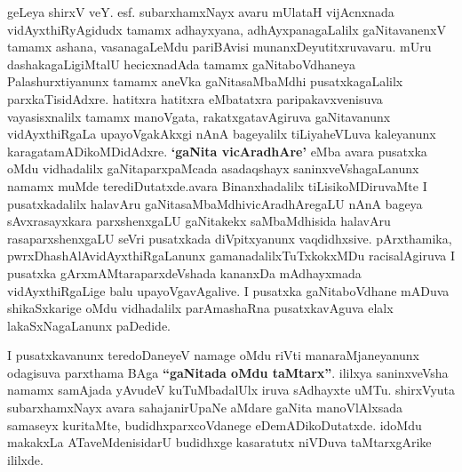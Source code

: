 {\newpage

geLeya shirxV veY. esf. subarxhamxNayx avaru mUlataH vijAcnxnada vidAyxthiRyAgidudx tamamx adhayxyana, adhAyxpanagaLalilx gaNitavanenxV tamamx ashana, vasanagaLeMdu pariBAvisi\- munanxDeyutitxruvavaru. mUru dashakagaLigiMtalU hecicxnadAda tamamx gaNitaboVdha\-neya Palashurxtiyanunx tamamx aneVka gaNitasaMbaMdhi pusatxkagaLalilx parxkaTisidAdxre. hatitxra hatitxra eMbatatxra paripakavxvenisuva vayasisxnalilx tamamx manoVgata, rakatxgatavAgiruva gaNitavanunx vidAyxthiRgaLa upayoVgakAkxgi nAnA bageyalilx tiLiyaheVLuva kale\-yanunx karagatamADikoMDidAdxre. {\bf `gaNita vicAradhAre'} eMba avara pusatxka oMdu vidhadalilx gaNitaparxpaMcada asadaqshayx saninxveVshagaLanunx namamx muMde terediDutatxde.\break avara Binanxhadalilx tiLisikoMDiruvaMte I pusatxkadalilx halavAru gaNitasaMbaMdhi\break vicAradhAregaLU nAnA bageya sAvxrasayxkara parxshenxgaLU gaNitakekx saMbaMdhisida hala\-vAru rasaparxshenxgaLU seVri pusatxkada diVpitxyanunx vaqdidhxsive. pArxthamika, pwrxDhashAlA\-vidAyxthiRgaLanunx gamanadalilxTuTxkokxMDu racisalAgiruva I pusatxka gArxmAMtara\break parxdeVshada kananxDa mAdhayxmada vidAyxthiRgaLige balu upayoVgavAgalive. I pusatxka gaNitaboVdhane mADuva shikaSxkarige oMdu vidhadalilx parAmashaRna pusatxkavAguva elalx lakaSxNagaLanunx paDedide.

\bigskip

I pusatxkavanunx teredoDaneyeV namage oMdu riVti manaraMjaneyanunx odagisuva parxthama BAga {\bf ``gaNitada oMdu taMtarx''}. ililxya saninxveVsha namamx samAjada yAvudeV kuTuMbadalUlx iruva sAdhayxte uMTu. shirxVyuta subarxhamxNayx avara sahajanirUpaNe aMdare gaNita manoVlAlxsada samaseyx kuritaMte, budidhxparxcoVdanege eDemADikoDutatxde. idoMdu makakxLa ATaveMdenisidarU budidhxge kasaratutx niVDuva taMtarxgArike ililxde.

\bigskip

}
